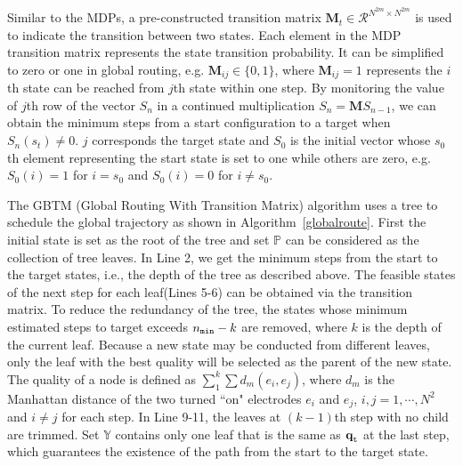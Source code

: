 \documentclass[conference, onecolumn]{IEEEtran}
\begin{document}
Similar to the MDPs, a pre-constructed transition matrix $\textbf{M}_t \in \mathcal{R}^{N^{2m} \times N^{2m}}$ is used to indicate the transition between two states. Each element in the MDP transition matrix represents the state transition probability. It can be simplified to zero or one in global routing, e.g. $\textbf{M}_{ij} \in \{0,1\}$, where $\textbf{M}_{ij} = 1$ represents the $i$th state can be reached from $j$th state within one step.
By monitoring the value of $j$th row of the vector $S_n$ in a continued multiplication $S_n =\textbf{M}S_{n-1}$, we can obtain the minimum steps from a start configuration to a target when $S_n(s_t)\neq 0$. $j$ corresponds the target state and $S_0$ is the initial vector whose $s_0$th element representing the start state is set to one while others are zero, e.g. $S_0(i) = 1$ for $i=s_0$ and $S_0(i) = 0$ for $i \neq s_0$.

The GBTM (Global Routing With Transition Matrix) algorithm uses a tree to schedule the global trajectory as shown in Algorithm~\ref{globalroute}. First the initial state is set as the root of the tree and set $\mathbb{P} $ can be considered as the collection of tree leaves. In Line 2, we get the minimum steps from the start to the target states, i.e., the depth of the tree as described above. The feasible states of the next step for each leaf(Lines 5-6) can be obtained via the transition matrix. To reduce the redundancy of the tree, the states whose minimum estimated steps to target exceeds $n_{\tt min}-k$ are removed, where $k$ is the depth of the current leaf. Because a new state may be conducted from different leaves, only the leaf with the best quality will be selected as the parent of the new state. The quality of a node is defined as $\sum_{1}^{k} \sum d_m(e_i,e_j)$, where $d_m$ is the Manhattan distance of the two turned ``on" electrodes $e_i$ and $e_j$, $i, j=1,\cdots, N^2$ and $i\neq j$ for each step. In Line 9-11, the leaves at $(k-1)$th step with no child are trimmed. Set $\mathbb{Y}$ contains only one leaf that is the same as $\textbf{q}_{\tt t}$ at the last step, which guarantees the existence of the path from the start to the target state.
\end{document}
